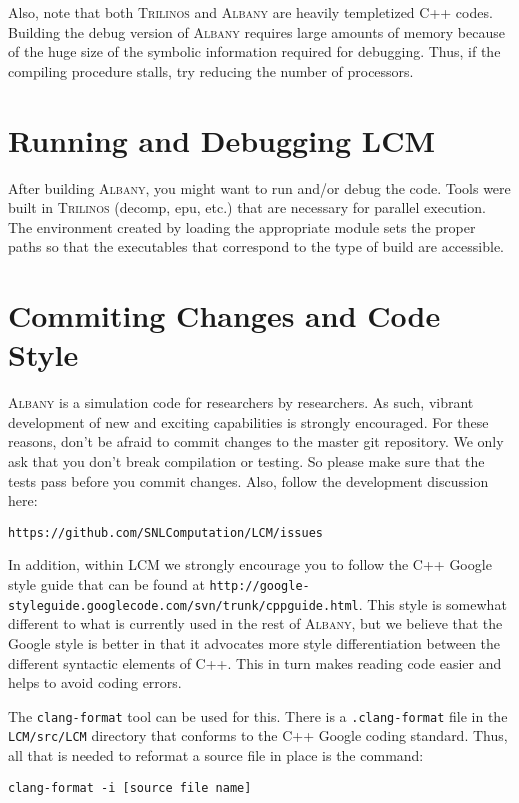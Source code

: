 \documentclass{article}
\newcommand{\trilinos}{\textsc{Trilinos}}
\newcommand{\albany}{\textsc{Albany}}
\newcommand{\lcm}{\textsc{LCM}}
\begin{document}
Also, note that both \trilinos{} and \albany{} are heavily templetized
C++ codes. Building the debug version of \albany{} requires large
amounts of memory because of the huge size of the symbolic information
required for debugging. Thus, if the compiling procedure stalls, try
reducing the number of processors.

\section{Running and Debugging \lcm{}} 

After building \albany{}, you might want to run and/or debug the code.
Tools were built in \trilinos{} (decomp, epu, etc.) that are necessary
for parallel execution. The environment created by loading the
appropriate module sets the proper paths so that the executables that
correspond to the type of build are accessible.

\section{Commiting Changes and Code Style}
\albany{} is a simulation code for researchers by researchers. As
such, vibrant development of new and exciting capabilities is strongly
encouraged. For these reasons, don't be afraid to commit changes to
the master git repository. We only ask that you don't break
compilation or testing. So please make sure that the tests pass before
you commit changes. Also, follow the development discussion here:
\begin{verbatim}
https://github.com/SNLComputation/LCM/issues
\end{verbatim}

In addition, within \lcm{} we strongly encourage you to follow the C++
Google style guide that can be found at
\verb+http://google-styleguide.googlecode.com/svn/trunk/cppguide.html+.
This style is somewhat different to what is currently used in the rest
of \albany{}, but we believe that the Google style is better in that
it advocates more style differentiation between the different
syntactic elements of C++. This in turn makes reading code easier and
helps to avoid coding errors.

The \verb+clang-format+ tool can be used for this. There is a
\verb+.clang-format+ file in the \verb+LCM/src/LCM+ directory that conforms
to the C++ Google coding standard. Thus, all that is needed to reformat a
source file in place is the command:
\begin{verbatim}
clang-format -i [source file name]
\end{verbatim}
\end{document}
